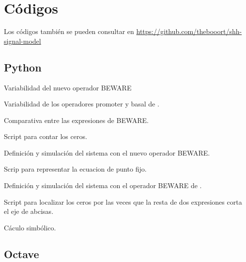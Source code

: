 \chapter{Códigos}
\label{ch:app}
Los códigos también se pueden consultar en \url{https://github.com/thebooort/shh-signal-model}
\section{Python}

Variabilidad del nuevo operador BEWARE



Variabilidad de los operadores promoter y basal de \cite{saha}.



Comparativa entre las expresiones de BEWARE.



Script para contar los ceros.



Definición y simulación del sistema con el nuevo operador BEWARE.



Scrip para representar la ecuacion de punto fijo.



Definición y simulación del sistema con el operador BEWARE de \cite{saha}.



Script para localizar los ceros por las veces que la resta de dos expresiones corta el eje de abcisas.



Cáculo simbólico.


\section{Octave}

